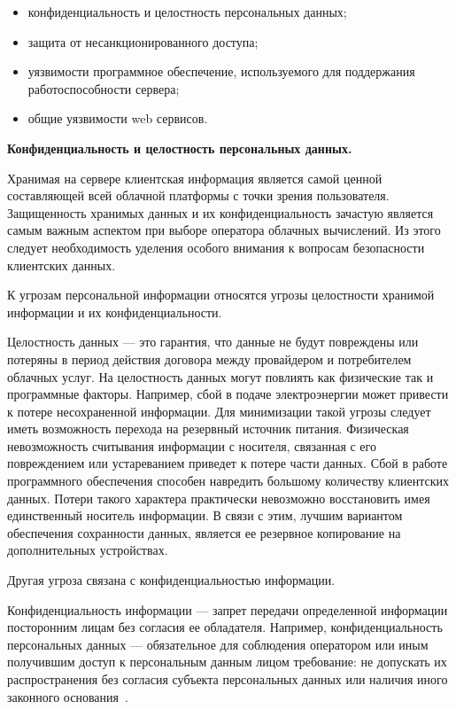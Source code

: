 \begin{itemize}
	\item конфиденциальность и целостность персональных данных;
	\item защита от несанкционированного доступа;
	\item уязвимости программное обеспечение, используемого для поддержания работоспособности сервера;
	\item общие уязвимости web сервисов.
\end{itemize}

\textbf{Конфиденциальность и целостность персональных данных.}

Хранимая на сервере клиентская информация является самой ценной составляющей  всей облачной платформы с точки зрения пользователя. Защищенность хранимых данных и их конфиденциальность зачастую является самым важным аспектом при выборе оператора облачных вычислений. Из этого следует необходимость уделения особого внимания к вопросам безопасности клиентских данных.

К угрозам персональной информации относятся угрозы целостности хранимой информации и их конфиденциальности.

Целостность данных --- это гарантия, что данные не будут повреждены или потеряны в период действия договора между провайдером и потребителем облачных услуг. На целостность данных могут повлиять как физические так и программные факторы. Например, сбой в подаче электроэнергии может привести к потере несохраненной информации. Для минимизации такой угрозы следует иметь возможность перехода на резервный источник питания. Физическая невозможность считывания информации с носителя, связанная с его повреждением или устареванием приведет к потере части данных. Сбой в работе программного обеспечения способен навредить большому количеству клиентских данных. Потери такого характера практически невозможно восстановить имея единственный носитель информации. В связи с этим, лучшим вариантом обеспечения сохранности данных, является ее резервное копирование на дополнительных устройствах.

Другая угроза связана с конфиденциальностью информации.

Конфиденциальность информации — запрет передачи определенной информации посторонним  лицам без согласия ее обладателя. Например, конфиденциальность персональных данных — обязательное для соблюдения оператором или иным получившим доступ к персональным данным лицом требование: не допускать их распространения без согласия субъекта персональных данных или наличия иного законного основания~\cite{lopatnikovDict}.

